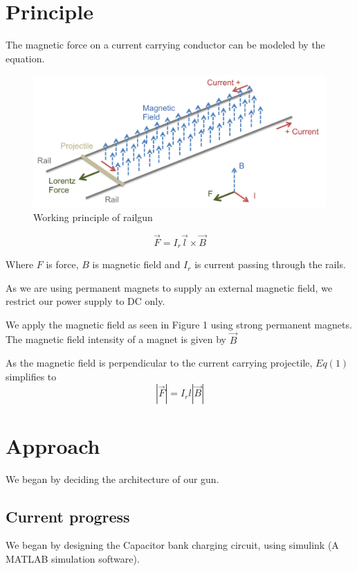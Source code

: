 \documentclass[twocolumn]{article}
\begin{document}
\section{Principle}

The magnetic force on a current carrying conductor can be modeled by the equation. 
	
\begin{figure}[htp]
	\caption{Working principle of railgun}
	\includegraphics[width=\linewidth]{railgun_physics.png}
\end{figure}
	
\begin{equation}
\vec{F}=I_{r} \vec{l} \times \vec{B}
\end{equation}

Where $F$ is force, $B$ is magnetic field and $I_{r}$ is current passing through the rails.

As we are using permanent magnets to supply an external magnetic field, we restrict our power supply to DC only.
 
	We apply the magnetic field as seen in Figure 1 using strong permanent magnets. The magnetic field intensity of a magnet is given by $\vec{B}$
	

As the magnetic field is perpendicular to the current carrying projectile, $Eq(1)$ simplifies to
 \[|\vec{F}|=I_{r} l|\vec{B}|\]



 

\section{Approach}
We began by deciding the architecture of our gun.

\subsection*{\textbf{Current progress}} 
We began by designing the Capacitor bank charging circuit, using simulink (A MATLAB simulation software).
\end{document}
